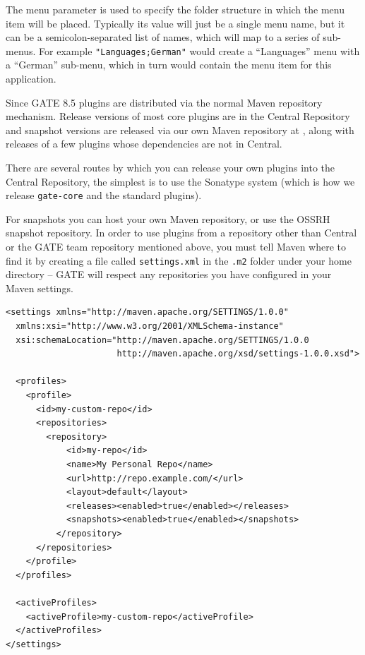 The menu parameter is used to specify the folder structure in which the menu
item will be placed. Typically its value will just be a single menu name, but
it can be a semicolon-separated list of names, which will map to a series of
sub-menus.  For example \verb!"Languages;German"! would create a ``Languages''
menu with a ``German'' sub-menu, which in turn would contain the menu item
for this application.



Since GATE 8.5 plugins are distributed via the normal Maven repository
mechanism.  Release versions of most core plugins are in the Central
Repository and snapshot versions are released via our own Maven repository at
, along with releases
of a few plugins whose dependencies are not in Central.

There are several routes by which you can release your own plugins into the
Central Repository, the simplest is to use the Sonatype
 system (which is how we release
\verb!gate-core! and the standard plugins).

For snapshots you can host your own Maven repository, or use the OSSRH snapshot
repository.  In order to use plugins from a repository other than Central or
the GATE team repository mentioned above, you must tell Maven where to find it
by creating a file called \verb!settings.xml! in the \verb!.m2! folder under
your home directory -- GATE will respect any repositories you have configured
in your Maven settings.
\begin{lstlisting}[lang=XML]
<settings xmlns="http://maven.apache.org/SETTINGS/1.0.0"
  xmlns:xsi="http://www.w3.org/2001/XMLSchema-instance"
  xsi:schemaLocation="http://maven.apache.org/SETTINGS/1.0.0
                      http://maven.apache.org/xsd/settings-1.0.0.xsd">

  <profiles>
    <profile>
      <id>my-custom-repo</id>
      <repositories>
        <repository>
            <id>my-repo</id>
            <name>My Personal Repo</name>
            <url>http://repo.example.com/</url>
            <layout>default</layout>
            <releases><enabled>true</enabled></releases>
            <snapshots><enabled>true</enabled></snapshots>
          </repository>
      </repositories>
    </profile>
  </profiles>

  <activeProfiles>
    <activeProfile>my-custom-repo</activeProfile>
  </activeProfiles>
</settings>
\end{lstlisting}

